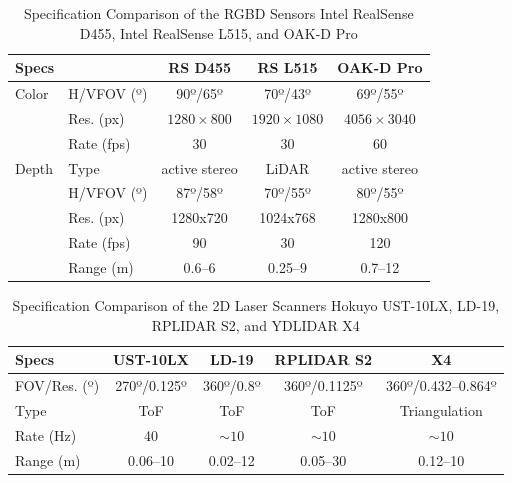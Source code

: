 \documentclass[letterpaper,10pt,conference]{IEEEtran} %
\begin{document}
\begin{table}[!t]
\renewcommand{\arraystretch}{1.15}
\setlength{\tabcolsep}{0.275em}
\caption{Specification Comparison of the RGBD Sensors
Intel RealSense D455, Intel RealSense L515, and OAK-D Pro}
\label{tab:specs:rgbd}
\centering
\begin{tabular}{l l c c c}
\hline
\bfseries Specs&&\bfseries RS D455&\bfseries RS L515&\bfseries OAK-D Pro\\
\hline
Color & H/VFOV (º) & 90º/65º & 70º/43º & 69º/55º\\
      & Res. (px)  & $1280\times 800$ & $1920\times 1080$ & $4056\times 3040$\\
      & Rate (fps) & 30 & 30 & 60\\
\hline
Depth & Type       & active stereo & LiDAR & active stereo\\
      & H/VFOV (º) & 87º/58º & 70º/55º & 80º/55º\\
      & Res. (px)  & 1280x720 & 1024x768 & 1280x800\\
      & Rate (fps) & 90 & 30 & 120\\
      & Range (m)  & 0.6--6 & 0.25--9 & 0.7--12\\
\hline
\end{tabular}
\end{table}

\begin{table}[!t]
\renewcommand{\arraystretch}{1.15}
\setlength{\tabcolsep}{0.275em}
\caption{Specification Comparison of the 2D Laser Scanners
Hokuyo UST-10LX, LD-19, RPLIDAR S2, and YDLIDAR X4}
\label{tab:specs:2D-lasers}
\centering
\begin{tabular}{l c c c c}
\hline
\bfseries Specs & \bfseries UST-10LX & \bfseries LD-19 &
\bfseries RPLIDAR S2 & \bfseries X4\\
\hline
FOV/Res. (º) & 270º/0.125º & 360º/0.8º & 360º/0.1125º & 360º/0.432--0.864º\\
Type         & ToF & ToF & ToF & Triangulation\\
Rate (Hz)    & 40 & $\sim 10$ & $\sim 10$ & $\sim 10$\\
Range (m)    & 0.06--10 & 0.02--12 & 0.05--30 & 0.12--10\\
\hline
\end{tabular}
\end{table}
\end{document}
